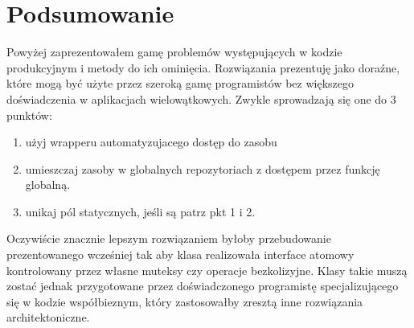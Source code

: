 \section{Podsumowanie}
Powyżej zaprezentowałem gamę problemów występujących w kodzie produkcyjnym i metody do ich ominięcia. Rozwiązania prezentuję jako doraźne, które mogą być użyte przez szeroką gamę programistów bez większego doświadczenia w aplikacjach wielowątkowych. Zwykle sprowadzają się one do 3 punktów:
\begin{enumerate}
\item użyj wrapperu  automatyzujacego dostęp do zasobu
\item umieszczaj zasoby w globalnych repozytoriach z dostępem przez funkcję globalną.
\item unikaj pól statycznych, jeśli są patrz pkt 1 i 2.
\end{enumerate}

Oczywiście znacznie lepszym rozwiązaniem byłoby przebudowanie prezentowanego wcześniej  tak aby klasa realizowała interface atomowy kontrolowany przez własne muteksy czy operacje bezkolizyjne. Klasy takie muszą zostać jednak przygotowane przez doświadczonego programistę specjalizującego się w kodzie współbieznym, który zastosowałby zresztą inne rozwiązania architektoniczne.
